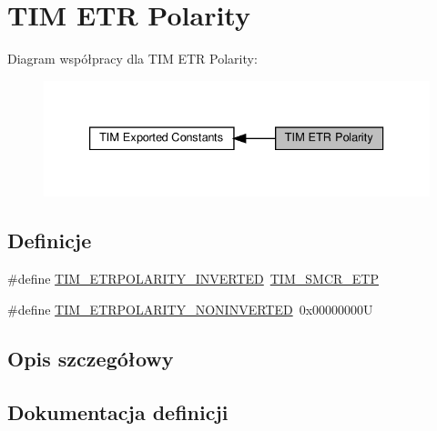 \hypertarget{group___t_i_m___e_t_r___polarity}{}\section{T\+IM E\+TR Polarity}
\label{group___t_i_m___e_t_r___polarity}
Diagram współpracy dla T\+IM E\+TR Polarity\+:\nopagebreak
\begin{figure}[H]
\begin{center}
\leavevmode
\includegraphics[width=333pt]{group___t_i_m___e_t_r___polarity}
\end{center}
\end{figure}
\subsection*{Definicje}
\begin{DoxyCompactItemize}
\item 
\#define \hyperlink{group___t_i_m___e_t_r___polarity_ga42652ff688f0042659f8304ae08abfa6}{T\+I\+M\+\_\+\+E\+T\+R\+P\+O\+L\+A\+R\+I\+T\+Y\+\_\+\+I\+N\+V\+E\+R\+T\+ED}~\hyperlink{group___peripheral___registers___bits___definition_ga2a5f335c3d7a4f82d1e91dc1511e3322}{T\+I\+M\+\_\+\+S\+M\+C\+R\+\_\+\+E\+TP}
\item 
\#define \hyperlink{group___t_i_m___e_t_r___polarity_ga7fa7c43245b25564414b2e191d5d8b14}{T\+I\+M\+\_\+\+E\+T\+R\+P\+O\+L\+A\+R\+I\+T\+Y\+\_\+\+N\+O\+N\+I\+N\+V\+E\+R\+T\+ED}~0x00000000U
\end{DoxyCompactItemize}


\subsection{Opis szczegółowy}


\subsection{Dokumentacja definicji}
\mbox{\label{group___t_i_m___e_t_r___polarity_ga42652ff688f0042659f8304ae08abfa6}} 
